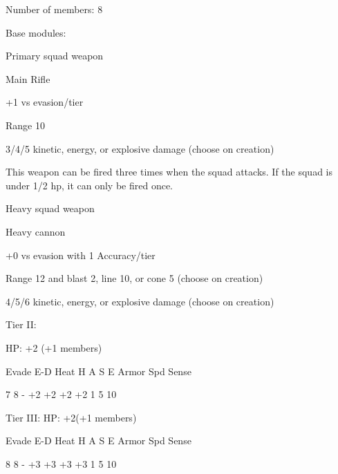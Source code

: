 Number of members: 8
 

Base modules:
 
Primary squad weapon
 
Main Rifle
 
+1 vs evasion/tier
 

                                                                                                          


Range 10
 
3/4/5 kinetic, energy, or explosive damage (choose on creation)
 
This weapon can be fired three times when the squad attacks. If the squad is under 1/2 hp, it can  
only be fired once.
 

Heavy squad weapon
 
Heavy cannon
 
+0 vs evasion with 1 Accuracy/tier
 
Range 12 and blast 2, line 10, or cone 5 (choose on creation)
 
4/5/6 kinetic, energy, or explosive damage (choose on creation)
 

Tier II:
 
HP: +2 (+1 members)
 

          Evade    E-D    Heat    H    A     S    E       Armor        Spd      Sense 

          7        8      -       +2   +2    +2   +2       1           5        10 

Tier III:  
HP: +2(+1 members)
 

          Evade    E-D    Heat    H    A     S    E       Armor        Spd      Sense 

         8         8      -       +3   +3    +3   +3       1           5        10 

                                    